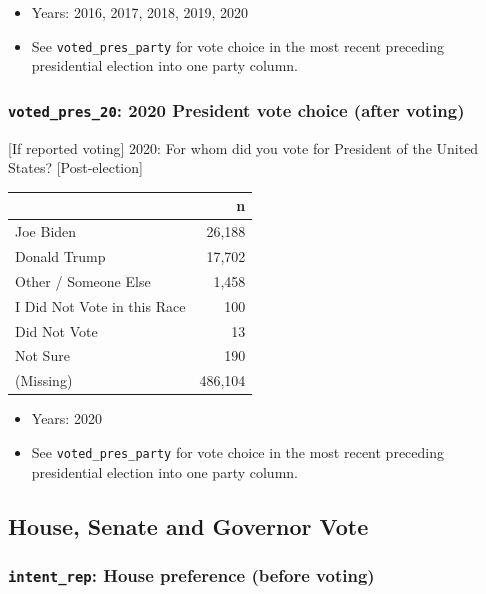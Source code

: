 \documentclass[10pt,article,oneside]{memoir}
\theoremstyle{definition}
\begin{document}
\begin{itemize}
\tightlist
\item
  Years: 2016, 2017, 2018, 2019, 2020
\item
  See \texttt{voted\_pres\_party} for vote choice in the most recent
  preceding presidential election into one party column.
\end{itemize}

\hypertarget{voted_pres_20-2020-president-vote-choice-after-voting}{%
\subsubsection{\texorpdfstring{\texttt{voted\_pres\_20}: 2020 President
vote choice (after
voting)}{voted\_pres\_20: 2020 President vote choice (after voting)}}\label{voted_pres_20-2020-president-vote-choice-after-voting}}

{[}If reported voting{]} 2020: For whom did you vote for President of
the United States? {[}Post-election{]}

\begin{table}[H]
\centering
\begin{tabular}[t]{lr}
\toprule
 & n\\
\midrule
Joe Biden & 26,188\\
Donald Trump & 17,702\\
Other / Someone Else & 1,458\\
I Did Not Vote in this Race & 100\\
Did Not Vote & 13\\
Not Sure & 190\\
(Missing) & 486,104\\
\bottomrule
\end{tabular}
\end{table}

\begin{itemize}
\tightlist
\item
  Years: 2020
\item
  See \texttt{voted\_pres\_party} for vote choice in the most recent
  preceding presidential election into one party column.
\end{itemize}

\hypertarget{house-senate-and-governor-vote}{%
\subsection{House, Senate and Governor
Vote}\label{house-senate-and-governor-vote}}

\hypertarget{intent_rep-house-preference-before-voting}{%
\subsubsection{\texorpdfstring{\texttt{intent\_rep}: House preference
(before
voting)}{intent\_rep: House preference (before voting)}}\label{intent_rep-house-preference-before-voting}}
\end{document}
